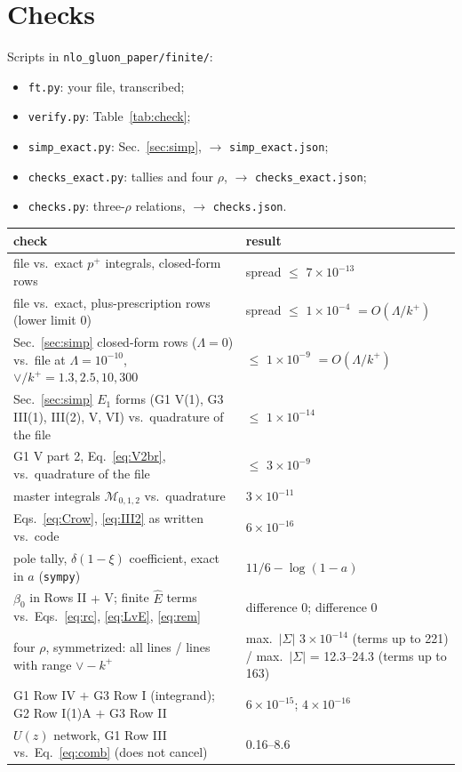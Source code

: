 \documentclass[10pt]{article}
\numberwithin{equation}{section}
\newcommand{\Eh}{\hat E}
\begin{document}
\section{Checks}\label{sec:checks}
Scripts in \texttt{nlo\_gluon\_paper/finite/}:
\begin{itemize}
\item \texttt{ft.py}: your file, transcribed;
\item \texttt{verify.py}: Table~\ref{tab:check};
\item \texttt{simp\_exact.py}: Sec.~\ref{sec:simp}, $\to$ \texttt{simp\_exact.json};
\item \texttt{checks\_exact.py}: tallies and four $\rho$, $\to$ \texttt{checks\_exact.json};
\item \texttt{checks.py}: three-$\rho$ relations, $\to$ \texttt{checks.json}.
\end{itemize}
\begin{table}[H]\centering\small
\begin{tabular}{@{}p{}p{}@{}}\toprule
check & result\\\midrule
file vs.\ exact $p^+$ integrals, closed-form rows & spread $\le$ $7\times10^{-13}$\\
file vs.\ exact, plus-prescription rows (lower limit $0$) & spread $\le$ $1\times10^{-4}$ $=O(\Lambda/k^+)$\\
Sec.~\ref{sec:simp} closed-form rows ($\Lambda=0$) vs.\ file at $\Lambda=10^{-10}$, $\vee/k^+=1.3,2.5,10,300$ & $\le$ $1\times10^{-9}$ $=O(\Lambda/k^+)$\\
Sec.~\ref{sec:simp} $E_1$ forms (G1 V(1), G3 III(1), III(2), V, VI) vs.\ quadrature of the file & $\le$ $1\times10^{-14}$\\
G1 V part 2, Eq.~\eqref{eq:V2br}, vs.\ quadrature of the file & $\le$ $3\times10^{-9}$\\
master integrals $\mathcal M_{0,1,2}$ vs.\ quadrature & $3\times10^{-11}$\\
Eqs.~\eqref{eq:Crow}, \eqref{eq:III2} as written vs.\ code & $6\times10^{-16}$\\
pole tally, $\delta(1-\xi)$ coefficient, exact in $a$ (\texttt{sympy}) & $11/6 - \log(1 - a)$\\
$\beta_0$ in Rows II $+$ V; finite $\Eh$ terms vs.\ Eqs.~\eqref{eq:rc}, \eqref{eq:LvE}, \eqref{eq:rem} & difference $0$; difference $0$\\
four $\rho$, symmetrized: all lines / lines with range $\vee-k^+$ & max.\ $|\Sigma|$ $3\times10^{-14}$ (terms up to 221) / max.\ $|\Sigma|$ = 12.3--24.3 (terms up to 163)\\
G1 Row IV $+$ G3 Row I (integrand); G2 Row I(1)A $+$ G3 Row II & $6\times10^{-15}$; $4\times10^{-16}$\\
$U(z)$ network, G1 Row III vs.\ Eq.~\eqref{eq:comb} (does not cancel) & 0.16--8.6\\\bottomrule
\end{tabular}
\end{table}
\end{document}
